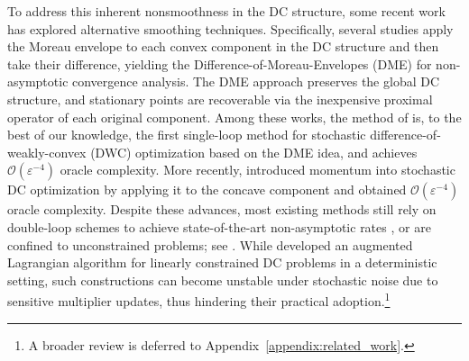 \documentclass{article}
\theoremstyle{plain}
\theoremstyle{definition}
\theoremstyle{remark}
\newcommand{\calO}{\mathcal{O}}
\numberwithin{equation}{section}
\begin{document}
To address this inherent nonsmoothness in the DC structure, some recent work has explored alternative smoothing techniques. Specifically, several studies \citep{moudafi2021complete,sun2023algorithms,hu2024single,chayti2025stochastic} apply the Moreau envelope to each convex component in the DC structure and then take their difference, yielding the Difference-of-Moreau-Envelopes (DME) for non-asymptotic convergence analysis. The DME approach preserves the global DC structure, and stationary points are recoverable via the inexpensive proximal operator of each original component. Among these works, the method of \citet{hu2024single} is, to the best of our knowledge, the first single-loop method for stochastic difference-of-weakly-convex (DWC) optimization based on the DME idea, and achieves $\calO(\varepsilon^{-4})$ oracle complexity. More recently, \citet{chayti2025stochastic} introduced momentum into stochastic DC optimization by applying it to the concave component and obtained $\calO(\varepsilon^{-4})$ oracle complexity. Despite these advances, most existing methods still rely on double-loop schemes to achieve state-of-the-art non-asymptotic rates \citep{nitanda2017stochastic,xu2019stochastic}, or are confined to unconstrained problems; see \citep{nitanda2017stochastic,xu2019stochastic,hu2024single,chayti2025stochastic}. While \citet{sun2023algorithms} developed an augmented Lagrangian algorithm for linearly constrained DC problems in a deterministic setting, such constructions can become unstable under stochastic noise due to sensitive multiplier updates, thus hindering their practical adoption.\footnote{A broader review is deferred to Appendix~\ref{appendix:related_work}.}
\end{document}
